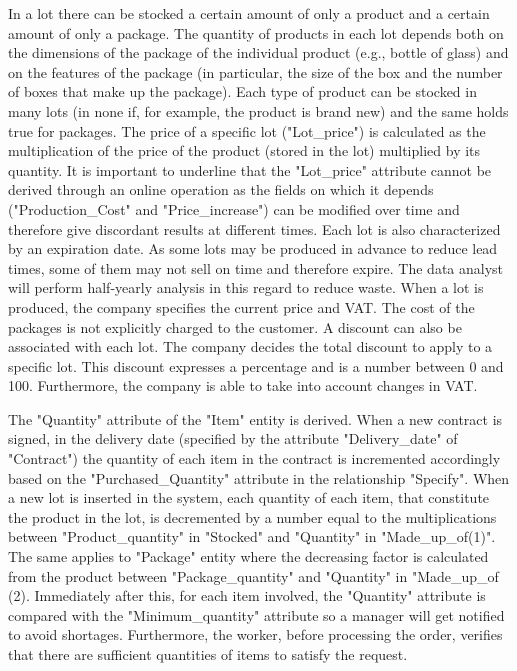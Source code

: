 In a lot there can be stocked a certain amount of only a product and a certain amount of only a package. The quantity of products in each lot depends both on the dimensions of the package of the individual product (e.g., bottle of glass) and on the features of the package (in particular, the size of the box and the number of boxes that make up the package). Each type of product can be stocked in many lots (in none if, for example, the product is brand new) and the same holds true for packages. The price of a specific lot ("Lot\_price") is calculated as the multiplication of the price of the product (stored in the lot) multiplied by its quantity. It is important to underline that the "Lot\_price" attribute cannot be derived through an online operation as the fields on which it depends ("Production\_Cost" and "Price\_increase") can be modified over time and therefore give discordant results at different times. Each lot is also characterized by an expiration date. As some lots may be produced in advance to reduce lead times, some of them may not sell on time and therefore expire. The data analyst will perform half-yearly analysis in this regard to reduce waste. When a lot is produced, the company specifies the current price and VAT. The cost of the packages is not explicitly charged to the customer. A discount can also be associated with each lot. The company decides the total discount to apply to a specific lot. This discount expresses a percentage and is a number between 0 and 100. Furthermore, the company is able to take into account changes in VAT.

The "Quantity" attribute of the "Item" entity is derived. When a new contract is signed, in the delivery date (specified by the attribute "Delivery\_date" of "Contract") the quantity of each item in the contract is incremented accordingly based on the "Purchased\_Quantity" attribute in the relationship "Specify". When a new lot is inserted in the system, each quantity of each item, that constitute the product in the lot, is decremented by a number equal to the multiplications between "Product\_quantity" in "Stocked" and "Quantity" in "Made\_up\_of(1)". The same applies to "Package" entity where the decreasing factor is calculated from the product between "Package\_quantity" and "Quantity" in "Made\_up\_of (2). Immediately after this, for each item involved, the "Quantity" attribute is compared with the "Minimum\_quantity" attribute so a manager will get notified to avoid shortages. Furthermore, the worker, before processing the order, verifies that there are sufficient quantities of items to satisfy the request.

